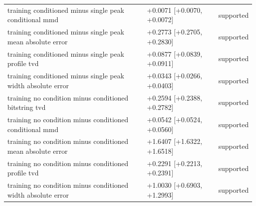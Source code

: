 \begin{table}[p]
\begin{tabular}{@{}p{}p{}p{}@{}}
training conditioned minus single peak conditional mmd & +0.0071 [+0.0070, +0.0072] & supported \\
training conditioned minus single peak mean absolute error & +0.2773 [+0.2705, +0.2830] & supported \\
training conditioned minus single peak profile tvd & +0.0877 [+0.0839, +0.0911] & supported \\
training conditioned minus single peak width absolute error & +0.0343 [+0.0266, +0.0403] & supported \\
training no condition minus conditioned bitstring tvd & +0.2594 [+0.2388, +0.2782] & supported \\
training no condition minus conditioned conditional mmd & +0.0542 [+0.0524, +0.0560] & supported \\
training no condition minus conditioned mean absolute error & +1.6407 [+1.6322, +1.6518] & supported \\
training no condition minus conditioned profile tvd & +0.2291 [+0.2213, +0.2391] & supported \\
training no condition minus conditioned width absolute error & +1.0030 [+0.6903, +1.2993] & supported \\
\bottomrule
\end{tabular}
\end{table}
\clearpage
